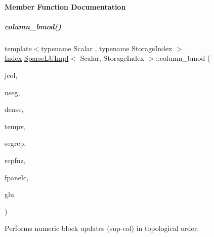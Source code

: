 \paragraph{Member Function Documentation}
\mbox{\label{group___sparse_l_u___module_ae34275602cf12560edfcaf7cd5cbe932}} 
\subparagraph{\texorpdfstring{column\+\_\+bmod()}{column\_bmod()}}
{\footnotesize\ttfamily template$<$typename Scalar , typename Storage\+Index $>$ \\
\hyperlink{namespace_eigen_a62e77e0933482dafde8fe197d9a2cfde}{Index} \hyperlink{group___sparse_l_u___module_class_eigen_1_1internal_1_1_sparse_l_u_impl}{Sparse\+L\+U\+Impl}$<$ Scalar, Storage\+Index $>$\+::column\+\_\+bmod (\begin{DoxyParamCaption}\item[{const \hyperlink{namespace_eigen_a62e77e0933482dafde8fe197d9a2cfde}{Index}}]{jcol,  }\item[{const \hyperlink{namespace_eigen_a62e77e0933482dafde8fe197d9a2cfde}{Index}}]{nseg,  }\item[{\hyperlink{group___core___module_class_eigen_1_1_ref}{Block\+Scalar\+Vector}}]{dense,  }\item[{\hyperlink{group___core___module}{Scalar\+Vector} \&}]{tempv,  }\item[{\hyperlink{group___core___module_class_eigen_1_1_ref}{Block\+Index\+Vector}}]{segrep,  }\item[{\hyperlink{group___core___module_class_eigen_1_1_ref}{Block\+Index\+Vector}}]{repfnz,  }\item[{\hyperlink{namespace_eigen_a62e77e0933482dafde8fe197d9a2cfde}{Index}}]{fpanelc,  }\item[{\hyperlink{struct_eigen_1_1internal_1_1_l_u___global_l_u__t}{Global\+L\+U\+\_\+t} \&}]{glu }\end{DoxyParamCaption})\hspace{0.3cm}{\ttfamily [protected]}}



Performs numeric block updates (sup-\/col) in topological order. 


